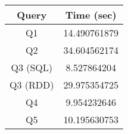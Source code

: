 \begin{tabular}{|c|c|}
\hline
Query&Time (sec) \\ 
\hline
\hline
Q1&14.490761879 \\ 
\hline
Q2&34.604562174 \\ 
\hline
Q3 (SQL)&8.527864204 \\ 
\hline
Q3 (RDD)&29.975354725 \\ 
\hline
Q4&9.954232646 \\ 
\hline
Q5&10.195630753 \\ 
\hline
\end{tabular}